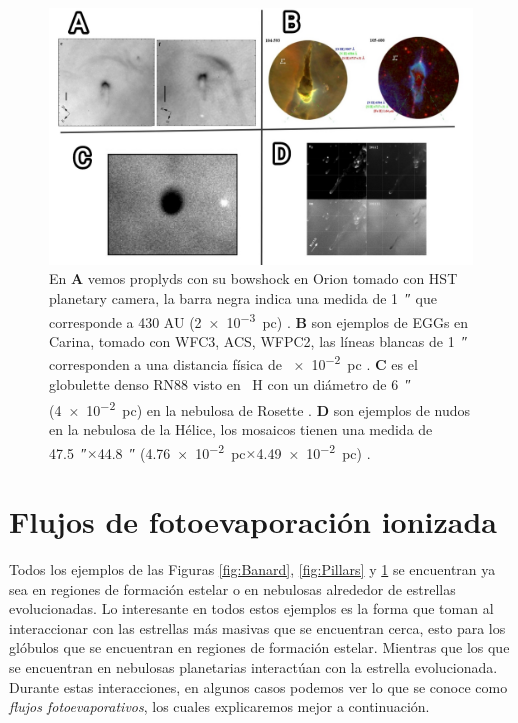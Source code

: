 \documentclass{book}
\begin{document}
\begin{figure}[htb]
    \centering
    \includegraphics[width=1 \textwidth]{images Chapter 1/C1_Globulettes.jpg}
    \caption{En \textbf{A} vemos proplyds con su bowshock en Orion tomado con HST planetary camera, la barra negra indica una medida de \SI{1}{\arcsecond} que corresponde a 430 AU (\SI{2e-3}{pc}) \citep{Garcia-Arredondo:2001}. \textbf{B} son ejemplos de EGGs en Carina, tomado con WFC3, ACS, WFPC2, las líneas blancas de \SI{1}{\arcsecond} corresponden a una distancia física de \SI{e-2}{pc} \citep{Mesa-Delgado:2016}. \textbf{C} es el globulette denso RN88 visto en \SI{}{H_\alpha} con un diámetro de \SI{6}{\arcsecond} (\SI{4e-2}{pc}) en la nebulosa de Rosette \citep{GFGahm:2013}. \textbf{D} son ejemplos de nudos en la nebulosa de la Hélice, los mosaicos tienen una medida de \SI{47.5}{\arcsecond}$\times$\SI{44.8}{\arcsecond} (\SI{4.76e-2}{pc}$\times$\SI{4.49e-2}{pc}) \citep{O'Dell:2007}. }
    \label{fig:nudos}
\end{figure}



\section{Flujos de fotoevaporación ionizada} \label{Sec:fluijos fotoevaporativos}

Todos los ejemplos de las Figuras \ref{fig:Banard}, \ref{fig:Pillars} y \ref{fig:nudos} se encuentran ya sea en regiones de formación estelar o en nebulosas alrededor de estrellas evolucionadas. Lo interesante en todos estos ejemplos es la forma que toman al interaccionar con las estrellas más masivas que se encuentran cerca, esto para los glóbulos que se encuentran en regiones de formación estelar.  Mientras que los que se encuentran en nebulosas planetarias interactúan con la estrella evolucionada. Durante estas interacciones, en algunos casos podemos ver lo que se conoce como \textit{flujos fotoevaporativos}, los cuales explicaremos mejor a continuación.
\end{document}
